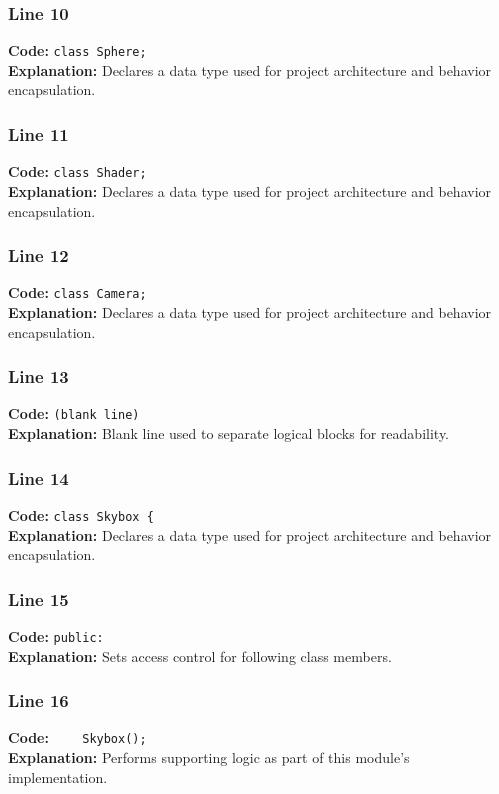 \documentclass[11pt,a4paper]{article}
\begin{document}
\subsubsection*{Line 10}
\textbf{Code:} \verb|class Sphere;|\\
\textbf{Explanation:} Declares a data type used for project architecture and behavior encapsulation.

\subsubsection*{Line 11}
\textbf{Code:} \verb|class Shader;|\\
\textbf{Explanation:} Declares a data type used for project architecture and behavior encapsulation.

\subsubsection*{Line 12}
\textbf{Code:} \verb|class Camera;|\\
\textbf{Explanation:} Declares a data type used for project architecture and behavior encapsulation.

\subsubsection*{Line 13}
\textbf{Code:} \texttt{(blank line)}\\
\textbf{Explanation:} Blank line used to separate logical blocks for readability.

\subsubsection*{Line 14}
\textbf{Code:} \verb|class Skybox {|\\
\textbf{Explanation:} Declares a data type used for project architecture and behavior encapsulation.

\subsubsection*{Line 15}
\textbf{Code:} \verb|public:|\\
\textbf{Explanation:} Sets access control for following class members.

\subsubsection*{Line 16}
\textbf{Code:} \verb|    Skybox();|\\
\textbf{Explanation:} Performs supporting logic as part of this module's implementation.
\end{document}
